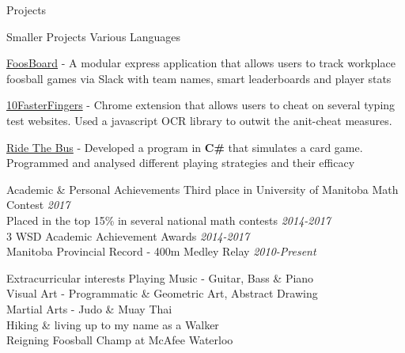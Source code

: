\documentclass{resume} %
\newcommand{\award}[2]{#1 \hfill {\em #2}}
\begin{document}
\begin{rSection}{Projects}
    \vspace{1em}

    \begin{sideproject}
        {Smaller Projects}
        {Various Languages}
        {}
        {
            \item {\href{https://github.com/wbhildeb/FoosBoard}{\faGithub{} FoosBoard}} - A modular express application that allows users to track workplace foosball games via Slack with team names, smart leaderboards and player stats
            \item {\href{https://github.com/wbhildeb/Ten-Faster-Fingers}{\faGithub{} 10FasterFingers}} - Chrome extension that allows users to cheat on several typing test websites. Used a javascript OCR library to outwit the anit-cheat measures.
            \item {\href{https://github.com/wbhildeb/Ride-The-Bus}{\faGithub{} Ride The Bus}} - Developed a program in \textbf{C\#} that simulates a card game. Programmed and analysed different playing strategies and their efficacy
        }
    \end{sideproject}



\end{rSection}


\begin{rSection}{Academic \& Personal Achievements}
    \award{Third place in University of Manitoba Math Contest}{2017} \\
    \award{Placed in the top 15\% in several national math contests}{2014-2017} \\
    \award{3 WSD Academic Achievement Awards}{2014-2017}\\
    \award{Manitoba Provincial Record - 400m Medley Relay}{2010-Present}\\
\end{rSection}


\begin{rSection}{Extracurricular interests}
    \award{Playing Music - Guitar, Bass \& Piano}{ }\\
    \award{Visual Art - Programmatic \& Geometric Art, Abstract Drawing}{ }\\
    \award{Martial Arts - Judo \& Muay Thai}{ }\\
    \award{Hiking \& living up to my name as a Walker}{ }\\
    \award{Reigning Foosball Champ at McAfee Waterloo}{ }\\
\end{rSection}
    
\end{document}
